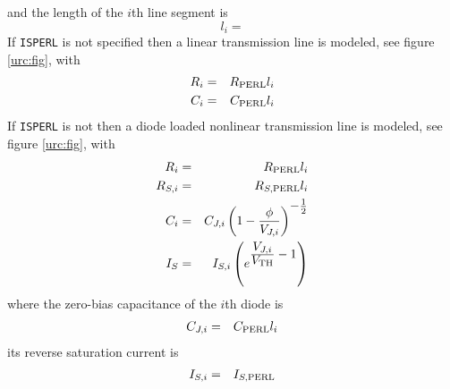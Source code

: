 and the length of the $i$th line segment is
\begin{equation}
l_i =
\end{equation}
If {\tt ISPERL} is not specified
then a linear transmission line is modeled, see figure \ref{urc:fig}, with
\begin{eqnarray}
R_i &=& R_{\mbox{\scriptsize PERL}} l_i\\
C_i &=& C_{\mbox{\scriptsize PERL}} l_i
\end{eqnarray}
If {\tt ISPERL} is not
then a diode loaded nonlinear transmission line is modeled,
see figure \ref{urc:fig}, with
\begin{eqnarray}
R_i &=& R_{\mbox{\scriptsize PERL}} l_i\\
R_{S,i} &=& R_{S,\mbox{\scriptsize PERL}} l_i\\
C_i &=& C_{J,i} \left(1 -
      {{\textstyle \phi}\over{\textstyle V_{J,i}}}\right)^{\textstyle
      -\frac{ 1}{2}}\\
I_S &=& I_{S,i}
        \left( e^{\textstyle{{\textstyle V_{J,i}}\over{\textstyle V_{\mbox{\scriptsize TH}}}}
         -1} \right)
\end{eqnarray}
where the zero-bias capacitance of the $i$th diode is
\begin{eqnarray}
C_{J,i} &=& C_{\mbox{\scriptsize PERL}} l_i
\end{eqnarray}
its reverse saturation current is
\begin{eqnarray}
I_{S,i} &=& I_{S,\mbox{\scriptsize PERL}}
\end{eqnarray}
